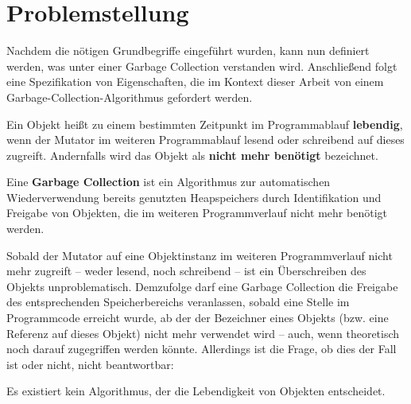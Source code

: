 

\section{Problemstellung}
\label{sec:intro:problem}
Nachdem die nötigen Grundbegriffe eingeführt wurden, kann nun definiert werden, was unter einer Garbage Collection verstanden wird.
Anschließend folgt eine Spezifikation von Eigenschaften, die im Kontext dieser Arbeit von einem Garbage-Collection-Algorithmus gefordert werden.

\begin{mybox}
\begin{defn}[Lebendigkeit]
	\label{def:liveness}
	Ein Objekt heißt zu einem bestimmten Zeitpunkt im Programmablauf \textbf{lebendig}, wenn der Mutator im weiteren Programmablauf lesend oder schreibend auf dieses zugreift.
	Andernfalls wird das Objekt als \textbf{nicht mehr benötigt} bezeichnet.
\end{defn}
\end{mybox}

\begin{mybox}
\begin{defn}
	\label{def:gc}
	Eine \textbf{Garbage Collection} ist ein Algorithmus zur automatischen Wiederverwendung bereits genutzten Heapspeichers durch Identifikation und Freigabe von Objekten, die im weiteren Programmverlauf nicht mehr benötigt werden.
\end{defn}
\end{mybox}

Sobald der Mutator auf eine Objektinstanz im weiteren Programmverlauf nicht mehr zugreift -- weder lesend, noch schreibend -- ist ein Überschreiben des Objekts unproblematisch.
Demzufolge darf eine Garbage Collection die Freigabe des entsprechenden Speicherbereichs veranlassen, sobald eine Stelle im Programmcode erreicht wurde, ab der der Bezeichner eines Objekts (bzw. eine Referenz auf dieses Objekt) nicht mehr verwendet wird -- auch, wenn theoretisch noch darauf zugegriffen werden könnte.
Allerdings ist die Frage, ob dies der Fall ist oder nicht, nicht beantwortbar:

\begin{mybox}
\begin{satz}
	Es existiert kein Algorithmus, der die Lebendigkeit von Objekten entscheidet.
\end{satz}
\end{mybox}

